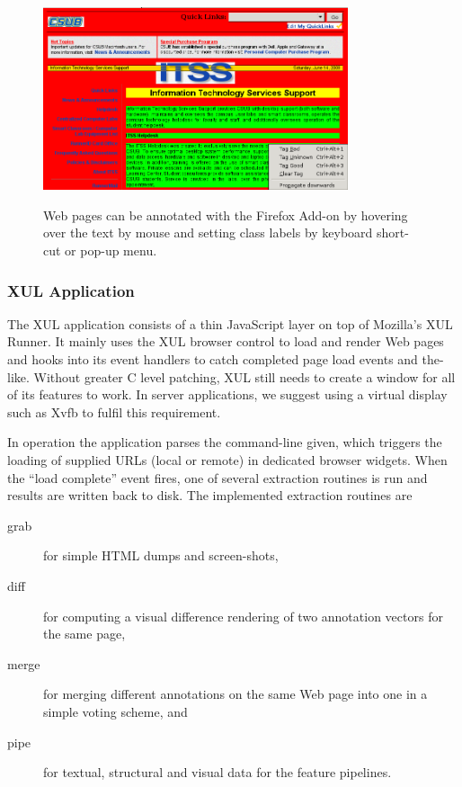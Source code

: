 \begin{figure}
	{\includegraphics[width=0.8\textwidth]{tut0}}
\caption{\label{f:tut0}Web pages can be annotated with the {\KrdWrd} Firefox Add-on by hovering over the text by mouse and setting class labels by keyboard short-cut or pop-up menu.}
\end{figure}


\subsubsection{XUL Application \label{app}}

The XUL application consists of a thin JavaScript layer on top of Mozilla's XUL Runner.
It mainly uses the XUL browser control to load and render Web pages and hooks into its event handlers to catch completed page load events and the-like.
Without greater C level patching, XUL still needs to create a window for all of its features to work.
In server applications, we suggest using a virtual display such as Xvfb to fulfil this requirement.

In operation the application parses the command-line given, which triggers the loading of supplied URLs (local or remote) in dedicated browser widgets.
When the ``load complete'' event fires, one of several extraction routines is run and results are written back to disk.
The implemented extraction routines are 
\begin{description}
\item[grab] for simple HTML dumps and screen-shots,
\item[diff] for computing a visual difference rendering of two annotation vectors for the same page,
\item[merge\label{merge}] for merging different annotations on the same Web page into one in a simple voting scheme, and
\item[pipe] for textual, structural and visual data for the feature pipelines.
\end{description}

